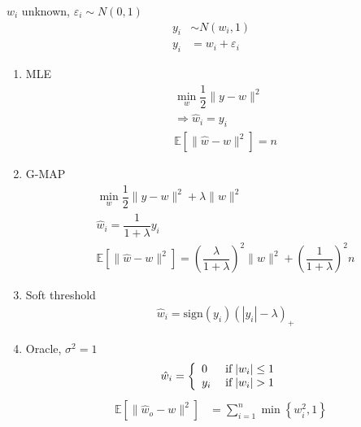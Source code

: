 \documentclass{article}
\begin{document}
$w_{i}$ unknown, $\varepsilon_{i} \sim  N\left(0, 1\right)$
\begin{align*}
y_{i} &  \sim  N\left(w_{i}, 1\right)
\\ y_{i} &= w_{i} + \varepsilon_{i}
\end{align*}
\begin{enumerate}
\item MLE
\begin{align*}
&  \displaystyle\min_{w} \dfrac{1}{2} \| y - w \|^{2}
\\ &\Rightarrow  \hat{w}_{i} = y_{i}
\\ &  \mathbb{E}\left[\| \hat{w} - w \|^{2}\right] = n 
\end{align*}
\item G-MAP
\begin{align*}
&  \displaystyle\min_{w} \dfrac{1}{2} \| y - w \|^{2} + \lambda \| w \|^{2}
\\ &  \hat{w}_{i} = \dfrac{1}{1 + \lambda} y_{i}
\\ &  \mathbb{E}\left[\| \hat{w} - w \|^{2}\right] = \left(\dfrac{\lambda}{1 + \lambda}\right)^{2} \| w \|^{2} + \left(\dfrac{1}{1 + \lambda}\right)^{2} n 
\end{align*}
\item Soft threshold
\begin{align*}
&  \hat{w}_{i} = \text{sign}\left(y_{i}\right)\left(| y_{i} | - \lambda\right)_{+}
\end{align*}
\item Oracle, $\sigma^{2} = 1$
\[ \hat{w}_{i} =\left\{ \begin{array}{ll}
0& \text{\;if\;} | w_{i} | \leq  1 \\
y_{i}& \text{\;if\;} | w_{i} | > 1 \\
\end{array}\right. \]
\begin{align*}
\mathbb{E}\left[\| \hat{w}_{o} - w \|^{2}\right] &= \displaystyle\sum_{i=1}^{n} \displaystyle\min\left\{w_{i}^{2}, 1\right\}
\end{align*}
\end{enumerate}
\end{document}
